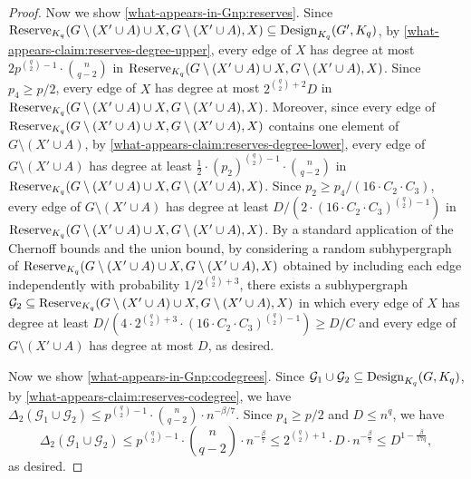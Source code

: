 \documentclass[11pt]{article}
\def\COMMENT#1{}
\numberwithin{equation}{section}
\newcounter{i}
\theoremstyle{plain}
\theoremstyle{plain} %
\theoremstyle{definition}
\newcommand{\cG}{\mathcal{G}}
\begin{document}
\begin{proof}
Now we show \ref{what-appears-in-Gnp:reserves}. 
Since ${\rm Reserve}_{K_q}(G \setminus (X' \cup A) \cup X, G \setminus (X' \cup A), X) \subseteq {\rm Design}_{K_q}(G', K_q)$, by \ref{what-appears-claim:reserves-degree-upper}, every edge of $X$ has degree at most $2p^{\binom{q}{2}-1}\cdot\binom{n}{q - 2}$ in ${\rm Reserve}_{K_q}(G \setminus (X' \cup A) \cup X, G \setminus (X' \cup A), X)$.  Since $p_4 \geq p/2$, every edge of $X$ has degree at most $2^{\binom{q}{2}+2}D$ in ${\rm Reserve}_{K_q}(G \setminus (X' \cup A) \cup X, G \setminus (X' \cup A), X)$.  Moreover, since every edge of ${\rm Reserve}_{K_q}(G \setminus (X' \cup A) \cup X, G \setminus (X' \cup A), X)$ contains one element of $G \setminus (X' \cup A)$,  by \ref{what-appears-claim:reserves-degree-lower}, every edge of $G \setminus (X' \cup A)$ has degree at least $\frac{1}{2}\cdot (p_2)^{\binom{q}{2}-1}\cdot\binom{n}{q - 2}$ in ${\rm Reserve}_{K_q}(G \setminus (X' \cup A) \cup X, G \setminus (X' \cup A), X)$.  Since $p_2 \geq p_4 / (16 \cdot C_2 \cdot C_3)$, every edge of $G \setminus (X' \cup A)$ has degree at least $D / (2\cdot (16\cdot C_2\cdot C_3)^{\binom{q}{2}-1})$ in ${\rm Reserve}_{K_q}(G \setminus (X' \cup A) \cup X, G \setminus (X' \cup A), X)$.  By a standard application of the Chernoff bounds and the union bound, by considering a random subhypergraph of ${\rm Reserve}_{K_q}(G \setminus (X' \cup A) \cup X, G \setminus (X' \cup A), X)$ obtained by including each edge independently with probability $1 / 2^{\binom{q}{2} + 3}$, there exists a subhypergraph $\cG_2 \subseteq {\rm Reserve}_{K_q}(G \setminus (X' \cup A) \cup X, G \setminus (X' \cup A), X)$ in which every edge of $X$ has degree at least $D / (4\cdot 2^{\binom{q}{2} + 3}\cdot (16\cdot C_2 \cdot C_3)^{\binom{q}{2} - 1}) \geq D / C$ and every edge of $G \setminus (X' \cup A)$ has degree at most $D$\COMMENT{
Indeed, the expected degree of an edge of $X$ is at least $D / (2\cdot 2^{\binom{q}{2} + 3}\cdot (16\cdot C_2 \cdot C_3)^{\binom{q}{2} - 1}) \geq D / C \geq n^{\beta}/C$ and by the Chernoff bounds, the probability that the degree of an edge of $X$ is less than half this quantity is at most $\exp(-n^{\beta}/(8C))$.  Similarly, the expected degree of an edge of $G \setminus (X' \cup A)$ is at most $D / 2$, and by the Chernoff bounds, the probability that the degree of an edge of $G \setminus (X' \cup A)$ is at most $D$ is at most $\exp(-D / 4) \leq \exp(-n^{\beta} / 4)$.  Since there are at most $n^2$ total edges, it follows from the union bound.
}, as desired.

Now we show \ref{what-appears-in-Gnp:codegrees}.
Since $\cG_1 \cup \cG_2 \subseteq {\rm Design}_{K_q}(G, K_q)$, by \ref{what-appears-claim:reserves-codegree}, we have $\Delta_2(\cG_1 \cup \cG_2) \leq p^{\binom{q}{2} - 1}\cdot \binom{n}{q - 2} \cdot n^{-\beta/7}$.  Since $p_4 \geq p / 2$ and $D \leq n^q$, we have
\begin{equation*}
    \Delta_2(\cG_1 \cup \cG_2) \leq p^{\binom{q}{2} - 1}\cdot \binom{n}{q - 2} \cdot n^{-\frac{\beta}{7}} \leq 2^{\binom{q}{2}+1}\cdot  D \cdot n^{-\frac{\beta}{7}} \leq D^{1 - \frac{\beta}{17q}},
\end{equation*}
as desired.



\end{proof}
\end{document}
